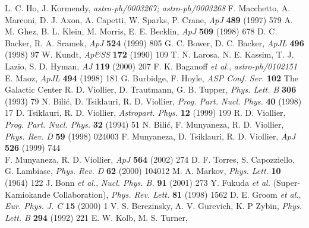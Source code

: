 \begin{thebibliography}{100}
				L. C. Ho, J. Kormendy,
								{\it astro-ph/0003267; astro-ph/0003268}
			F. Macchetto, A. Marconi, D. J. Axon, A. Capetti, W. Sparks, P. Crane,
								{\it ApJ} {\bf 489} (1997) 579
				A. M. Ghez, B. L. Klein, M. Morris, E. E. Becklin,
								{\it ApJ} {\bf 509} (1998) 678
				D. C. Backer, R. A. Sramek,
								{\it ApJ} {\bf 524} (1999) 805
					G. C. Bower, D. C. Backer,
								{\it ApJL} {\bf 496} (1998) 97
					W. Kundt,
								{\it Ap\&SS} {\bf 172} (1990) 109
					T. N. Larosa, N. E. Kassim, T. J. Lazio, S. D. Hyman,
								{\it AJ} {\bf 119} (2000) 207
				F. K. Baganoff {\it et al.},
								{\it astro-ph/0102151}
					E. Maoz,
								{\it ApJL} {\bf 494} (1998) 181
					G. Burbidge, F. Hoyle,
								{\it ASP Conf. Ser.} {\bf 102} The Galactic Center
					R. D. Viollier, D. Trautmann, G. B. Tupper,
								{\it Phys. Lett. B} {\bf 306} (1993) 79
					N. Bili\'{c}, D. Tsiklauri, R. D. Viollier,
								{\it Prog. Part. Nucl. Phys.} {\bf 40} (1998) 17
					D. Tsiklauri, R. D. Viollier,
								{\it Astropart. Phys.} {\bf 12} (1999) 199
			R. D. Viollier,
								{\it Prog. Part. Nucl. Phys.} {\bf 32} (1994) 51
					N. Bili\'{c}, F. Munyaneza, R. D. Viollier,
								{\it Phys. Rev. D} {\bf 59} (1998) 024003
				F. Munyaneza, D. Tsiklauri, R. D. Viollier,
								{\it ApJ} {\bf 526} (1999) 744\\
							F. Munyaneza, R. D. Viollier,
								{\it ApJ} {\bf 564} (2002) 274
					D. F. Torres, S. Capozziello, G. Lambiase,
								{\it Phys. Rev. D} {\bf 62} (2000) 104012
				M. A. Markov,
								{\it Phys. Lett.} {\bf 10} (1964) 122
				J. Bonn {\it et al.},
								{\it Nucl. Phys. B.} {\bf 91} (2001) 273
				Y. Fukuda {\it et al.} (Super-Kamiokande Collaboration),
								{\it Phys. Rev. Lett.} {\bf 81} (1998) 1562
				D. E. Groom {\it et al.},
								{\it Eur. Phys. J. C} {\bf 15} (2000) 1
				V. S. Berezinsky, A. V. Gurevich, K. P Zybin,
								{\it Phys. Lett. B} {\bf 294} (1992) 221
				E. W. Kolb, M. S. Turner,

\end{thebibliography}

